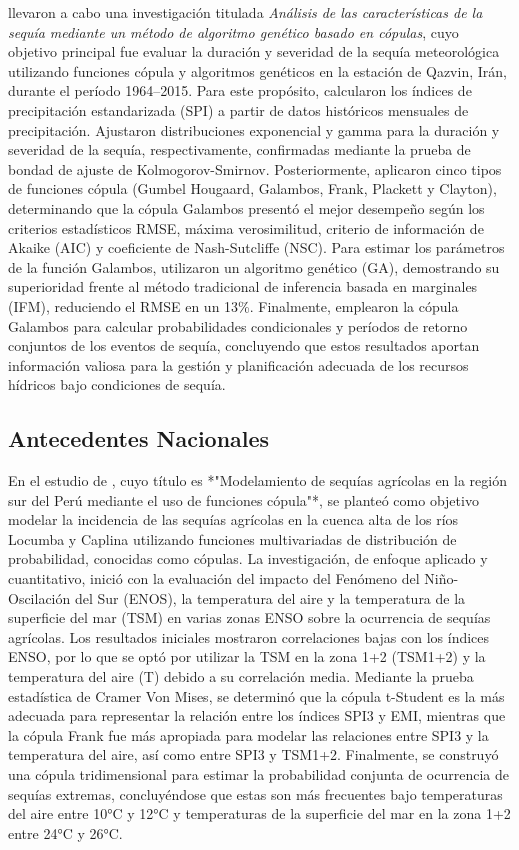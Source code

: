 \textcite{Kiafar2020} llevaron a cabo una investigación titulada \emph{Análisis de las características de la sequía mediante un método de algoritmo genético basado en cópulas}, cuyo objetivo principal fue evaluar la duración y severidad de la sequía meteorológica utilizando funciones cópula y algoritmos genéticos en la estación de Qazvin, Irán, durante el período 1964--2015. Para este propósito, calcularon los índices de precipitación estandarizada (SPI) a partir de datos históricos mensuales de precipitación. Ajustaron distribuciones exponencial y gamma para la duración y severidad de la sequía, respectivamente, confirmadas mediante la prueba de bondad de ajuste de Kolmogorov-Smirnov. Posteriormente, aplicaron cinco tipos de funciones cópula (Gumbel Hougaard, Galambos, Frank, Plackett y Clayton), determinando que la cópula Galambos presentó el mejor desempeño según los criterios estadísticos RMSE, máxima verosimilitud, criterio de información de Akaike (AIC) y coeficiente de Nash-Sutcliffe (NSC). Para estimar los parámetros de la función Galambos, utilizaron un algoritmo genético (GA), demostrando su superioridad frente al método tradicional de inferencia basada en marginales (IFM), reduciendo el RMSE en un 13\%. Finalmente, emplearon la cópula Galambos para calcular probabilidades condicionales y períodos de retorno conjuntos de los eventos de sequía, concluyendo que estos resultados aportan información valiosa para la gestión y planificación adecuada de los recursos hídricos bajo condiciones de sequía.

\subsection{Antecedentes Nacionales}

En el estudio de \textcite{Cabrera2023}, cuyo título es *"Modelamiento de sequías agrícolas en la región sur del Perú mediante el uso de funciones cópula"*, se planteó como objetivo modelar la incidencia de las sequías agrícolas en la cuenca alta de los ríos Locumba y Caplina utilizando funciones multivariadas de distribución de probabilidad, conocidas como cópulas. La investigación, de enfoque aplicado y cuantitativo, inició con la evaluación del impacto del Fenómeno del Niño-Oscilación del Sur (ENOS), la temperatura del aire y la temperatura de la superficie del mar (TSM) en varias zonas ENSO sobre la ocurrencia de sequías agrícolas. Los resultados iniciales mostraron correlaciones bajas con los índices ENSO, por lo que se optó por utilizar la TSM en la zona 1+2 (TSM1+2) y la temperatura del aire (T) debido a su correlación media. Mediante la prueba estadística de Cramer Von Mises, se determinó que la cópula t-Student es la más adecuada para representar la relación entre los índices SPI3 y EMI, mientras que la cópula Frank fue más apropiada para modelar las relaciones entre SPI3 y la temperatura del aire, así como entre SPI3 y TSM1+2. Finalmente, se construyó una cópula tridimensional para estimar la probabilidad conjunta de ocurrencia de sequías extremas, concluyéndose que estas son más frecuentes bajo temperaturas del aire entre 10°C y 12°C y temperaturas de la superficie del mar en la zona 1+2 entre 24°C y 26°C.

